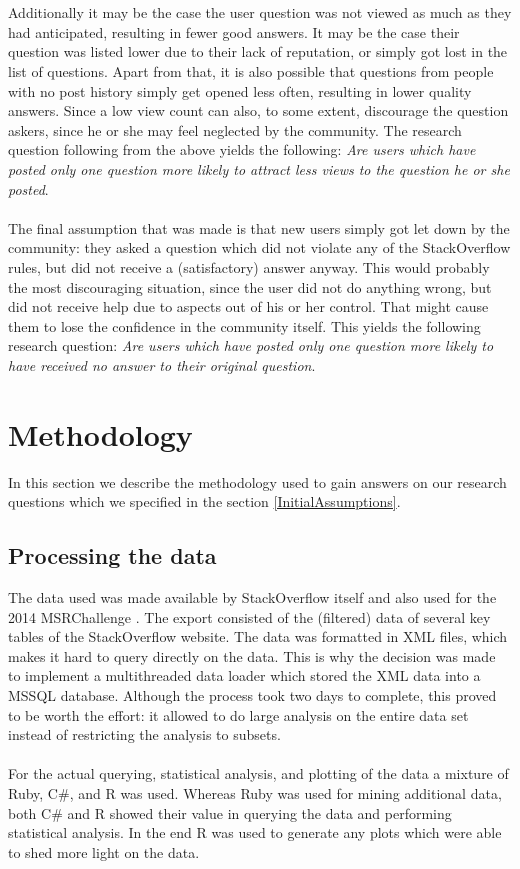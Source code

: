 \documentclass[conference]{IEEEtran}
\begin{document}
\\
\\
Additionally it may be the case the user question was not viewed as much as they had anticipated, resulting in fewer good answers. It may be the case their question was listed lower due to their lack of reputation, or simply got lost in the list of questions. Apart from that, it is also possible that questions from people with no post history simply get opened less often, resulting in lower quality answers. Since a low view count can also, to some extent, discourage the question askers, since he or she may feel neglected by the community. The research question following from the above yields the following: \textit{Are users which have posted only one question more likely to attract less views to the question he or she posted}.
\\
\\
The final assumption that was made is that new users simply got let down by the community: they asked a question which did not violate any of the StackOverflow rules, but did not receive a (satisfactory) answer anyway. This would probably the most discouraging situation, since the user did not do anything wrong, but did not receive help due to aspects out of his or her control. That might cause them to lose the confidence in the community itself. This yields the following research question: \textit{Are users which have posted only one question more likely to have received no answer to their original question}. 

\section{Methodology}
\label{Methodology}

In this section we describe the methodology used to gain answers on our research questions which we specified in the section \ref{InitialAssumptions}.

\subsection{Processing the data}

The data used was made available by StackOverflow itself and also used for the 2014 MSRChallenge \cite{msrchallenge-website}. The export consisted of the (filtered) data of several key tables of the StackOverflow website. The data was formatted in XML files, which makes it hard to query directly on the data. This is why the decision was made to implement a multithreaded data loader which stored the XML data into a MSSQL database. Although the process took two days to complete, this proved to be worth the effort: it allowed to do large analysis on the entire data set instead of restricting the analysis to subsets.
\\
\\
For the actual querying, statistical analysis, and plotting of the data a mixture of Ruby, C\#, and R was used. Whereas Ruby was used for mining additional data,  both C\# and R showed their value in querying the data and performing statistical analysis. In the end R was used to generate any plots which were able to shed more light on the data.
\end{document}
